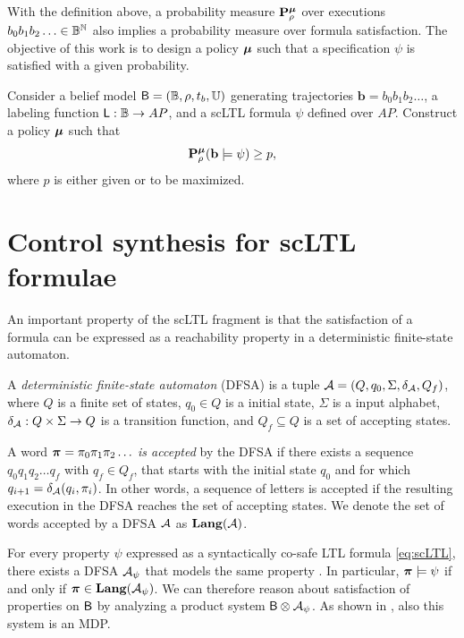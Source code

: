 \documentclass{ifacconf}
\begin{document}
With the definition above, a probability measure $\mathbf{P}_\rho^{\boldsymbol{\mu}}$ over executions $b_0 b_1 b_2 \ldots\in \mathbb{B}^{\mathbb N}$ also implies a probability measure over formula satisfaction. The objective of this work is to design a policy ${\boldsymbol{\mu}}$ such that a specification $\psi$ is satisfied with a given probability.

\begin{problem}
\label{prob:main}
  Consider a belief model $\mathsf{B} = (\mathbb{B}, \rho, t_b, {\mathbb{U}})$ generating trajectories $\mathbf{b} = b_0 b_1 b_2 \ldots$, a labeling function $\mathsf{L} : \mathbb{B} \rightarrow AP$, and a scLTL formula $\psi$ defined over $AP$. Construct a policy ${\boldsymbol{\mu}}$ such that
  \begin{equation}
    \mathbf{P}_\rho^{\boldsymbol{\mu}} ( \mathbf{b} \models \psi )\geq p,
  \end{equation}
  where $p$ is either given or to be maximized.
\end{problem}


\section{Control synthesis for scLTL formulae}
\label{sec:exact_synth}

An important property of the scLTL fragment is that the satisfaction of a formula can be expressed as a reachability property in a deterministic finite-state automaton.

\begin{definition}
  A \emph{deterministic finite-state automaton} (DFSA) is a tuple $\mathcal{A} = (Q, q_0, \Sigma, \delta_{\mathcal{A}}, Q_f)$, where $Q$ is a finite set of states, $q_0 \in Q$ is a initial state, $\Sigma$ is a input alphabet, $\delta_{\mathcal{A}} : Q \times \Sigma \rightarrow Q$ is a transition function, and $Q_f\subseteq Q$ is a set of accepting states.

  A word ${\boldsymbol{\pi}} = \pi_0 \pi_1 \pi_2 \ldots$ \emph{is accepted} by the DFSA if there exists a sequence $q_0 q_1 q_2 \ldots q_f$ with $q_f\in Q_f$, that starts with the initial state $q_0$ and for which $q_{i+1}=\delta_{\mathcal{A}}(q_i,\pi_i)$. In other words, a sequence of letters is accepted if the resulting execution in the DFSA reaches the set of accepting states. We denote the set of words accepted by a DFSA $\mathcal{A}$ as $\mathbf{Lang} (\mathcal A)$.
\end{definition}

For every property $\psi$ expressed as a syntactically co-safe LTL formula \eqref{eq:scLTL}, there exists a DFSA  $\mathcal{A}_\psi$ that models the same property \citep{Belta2017}. In particular, ${\boldsymbol{\pi}}\models\psi$ if and only if ${\boldsymbol{\pi}}\in \mathbf{Lang}(\mathcal{A}_\psi)$. We can therefore reason about satisfaction of properties on $\mathsf{B}$ by analyzing a product system $\mathsf{B} \otimes \mathcal{A}_\psi$. As shown in \citep{tmka2013}, also this system is an MDP.
\end{document}
